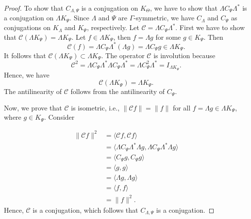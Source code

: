 \documentclass[10pt,a4paper]{amsart}
\begin{document}
\begin{proof}
To show that $C_{\Lambda,\Psi}$ is a conjugation on $K_{\Theta}$, we have to show that $\Lambda C_{\Psi}\Lambda^*$ is a conjugation on $\Lambda K_{\Psi}$. Since $\Lambda$ and $\Psi$ are $\Gamma$-symmetric, we have $C_{\Lambda}$ and $C_{\Psi}$ as conjugations on $K_{\Lambda}$ and $K_{\Psi}$, respectively. Let $\mathcal{C}=\Lambda C_{\Psi}\Lambda^*$. First we have to show that $\mathcal{C}(\Lambda K_\Psi)=\Lambda K_\Psi$.
Let $f\in \Lambda K_\Psi$, then $f=\Lambda g$ for some $g\in K_\Psi$. Then
$$\mathcal{C}(f)=\Lambda C_\Psi\Lambda^*(\Lambda g)=\Lambda C_\Psi g \in \Lambda K_\Psi.$$ It follows that $\mathcal{C}(\Lambda K_\Psi) \subset  \Lambda K_\Psi$.
The operator $\mathcal{C}$ is involution because $$\mathcal{C}^2=\Lambda C_{\Psi}\Lambda^* \Lambda C_{\Psi}\Lambda^*=\Lambda C_{\Psi}^2\Lambda^*=I_{\Lambda K_\Psi}.$$
Hence, we have
$$\mathcal{C}(\Lambda K_\Psi)=\Lambda K_\Psi.$$
The antilinearity of $\mathcal{C}$ follows from the antilinearity of $C_\Psi$.

Now, we prove that $\mathcal{C}$ is isometric, i.e., $\|\mathcal{C}f\|=\|f\|$ for all $f=\Lambda g\in  \Lambda K_{\Psi}$, where $g\in K_{\Psi}$. Consider

\begin{align*}
\|\mathcal{C}f\|^{2}
&=\langle
\mathcal{C}f, \mathcal{C}f
\rangle\\
&=\langle
\Lambda C_\Psi \Lambda^*\Lambda g, \Lambda C_\Psi \Lambda^*\Lambda g
\rangle \\
&=\langle
 C_\Psi g, C_\Psi g
\rangle \\
&=\langle
 g, g
\rangle\\
&=\langle
 \Lambda g, \Lambda g
\rangle\\
&=\langle
 f, f
\rangle\\
&=\|f\|^{2}.
\end{align*}
Hence, $\mathcal{C}$ is a conjugation, which follows that $C_{\Lambda, \Psi}$ is a conjugation.
\end{proof}
\end{document}
